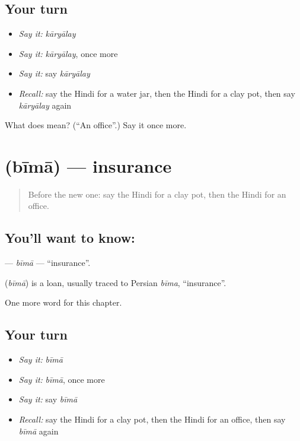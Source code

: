 \subsection*{Your turn}
\begin{itemize}
\raggedright
  \item \emph{Say it:} \emph{kāryālay}
  \item \emph{Say it:} \emph{kāryālay}, once more
  \item \emph{Say it:} say \emph{kāryālay}
  \item \emph{Recall:} say the Hindi for a water jar, then the Hindi for a clay pot, then say \emph{kāryālay} again
\end{itemize}

\begin{tcolorbox}[breakable,colback=teal!4,colframe=teal!35!black,title={Before you move on}]
What does  mean? (\textquotedblleft{}An office\textquotedblright{}.) Say it once more.
\end{tcolorbox}
\section[\texorpdfstring{\hi{बीमा} (bīmā)}{बीमा (bīmā)}]{ (bīmā) — insurance}

\label{lesson:HI-C271-bima}



\begin{quote}
Before the new one: say the Hindi for a clay pot, then the Hindi for an office.
\end{quote}

\subsection*{You'll want to know: }
\textbf{} — \emph{bīmā} — \textquotedblleft{}insurance\textquotedblright{}.

\begin{cousinweb}
\textbf{} (\emph{bīmā}) is a loan, usually traced to Persian \emph{bīma}, \textquotedblleft{}insurance\textquotedblright{}.
\end{cousinweb}

\begin{grammarlens}[title={What you've built}]
One more word for this chapter.
\end{grammarlens}

\subsection*{Your turn}
\begin{itemize}
\raggedright
  \item \emph{Say it:} \emph{bīmā}
  \item \emph{Say it:} \emph{bīmā}, once more
  \item \emph{Say it:} say \emph{bīmā}
  \item \emph{Recall:} say the Hindi for a clay pot, then the Hindi for an office, then say \emph{bīmā} again
\end{itemize}

